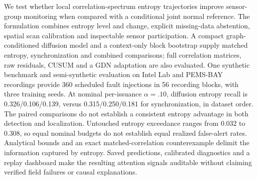 We test whether local correlation-spectrum entropy trajectories improve sensor-group monitoring when compared with a conditional joint normal reference. The formulation combines entropy level and change, explicit missing-data abstention, spatial scan calibration and inspectable sensor participation. A compact graph-conditioned diffusion model and a context-only block bootstrap supply matched entropy, synchronization and combined comparisons; full correlation matrices, raw residuals, CUSUM and a GDN adaptation are also evaluated. One synthetic benchmark and semi-synthetic evaluation on Intel Lab and PEMS-BAY recordings provide 360 scheduled fault injections in 56 recording blocks, with three training seeds. At nominal per-issuance $\alpha=.10$, diffusion entropy recall is 0.326/0.106/0.139, versus 0.315/0.250/0.181 for synchronization, in dataset order. The paired comparisons do not establish a consistent entropy advantage in both detection and localization. Untouched entropy exceedance ranges from 0.032 to 0.308, so equal nominal budgets do not establish equal realized false-alert rates. Analytical bounds and an exact matched-correlation counterexample delimit the information captured by entropy. Saved predictions, calibrated diagnostics and a replay dashboard make the resulting attention signals auditable without claiming verified field failures or causal explanations.
